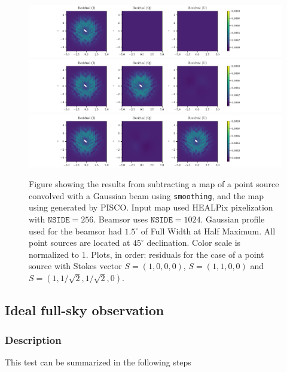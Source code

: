\documentclass[a4paper,11pt]{article}
\begin{document}
\begin{figure}
	\centering
	\includegraphics[width=1.0\linewidth]{figures/stokes_I_source_256_beam_1024_dec_45.pdf}
	\includegraphics[width=1.0\linewidth]{figures/stokes_Q_source_256_beam_1024_dec_45.pdf}
	\includegraphics[width=1.0\linewidth]{figures/stokes_U_source_256_beam_1024_dec_45.pdf}
	\caption{Figure showing the results from subtracting a map of a point source convolved with a Gaussian beam using \texttt{smoothing}, and the map using generated by PISCO. Input map used HEALPix pixelization with $\mathrm{\texttt{NSIDE}} = 256$. Beamsor uses $\mathrm{\texttt{NSIDE}} = 1024$. Gaussian profile used for the beamsor had $1.5^\circ$ of Full Width at Half Maximum. All point sources are located at $45^\circ$ declination. Color scale is normalized to $1$. Plots, in order: residuals for the case of a point source with Stokes vector $S = (1,0,0,0)$, $S=(1,1,0,0)$ and $S=(1,1/\sqrt{2},1/\sqrt{2},0)$. }
	\label{fig::stokesqsource256beam1024dec45}
\end{figure}

\subsection{Ideal full-sky observation}
\label{sec::ideal_full_sky}

\subsubsection{Description}

This test can be summarized in the following steps
\end{document}
